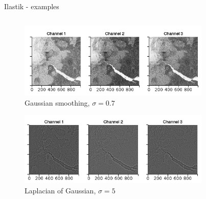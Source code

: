 \documentclass{beamer}
\begin{document}
\begin{frame}[noframenumbering]{Ilastik - examples}
\begin{columns}[T] %
\begin{column}{.8\textwidth}
\begin{figure}[!ht]
\centering
\includegraphics[width=.7\textwidth]{part3_sub1.png}
\caption{Gaussian smoothing, $\sigma=0.7$}
\label{}
\end{figure}
\begin{figure}[!ht]
\centering
\includegraphics[width=.7\textwidth]{part3_sub2.png}
\caption{Laplacian of Gaussian, $\sigma=5$}
\label{}
\end{figure}
\end{column}%
\begin{column}{.2\textwidth}
\begin{figure}[!ht]
\centering

\end{figure}
\end{column}
\end{columns}
\end{frame}
\end{document}

